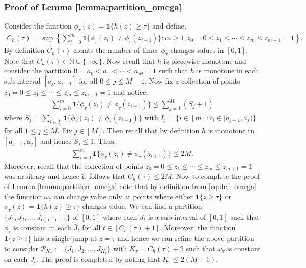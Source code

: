 \documentclass[11pt]{article}
\numberwithin{equation}{section}
\theoremstyle{definition}
\newcommand{\N}{\mathbb{N}}
\newcommand{\cP}{\mathcal{P}}
\newcommand{\one}{\bm{1}}
\begin{document}
\subsubsection{Proof of Lemma \ref{lemma:partition_omega}}\label{appendix:proofof_partition_omega}
Consider the function $\phi_\tau(z) = \one\{h(z)\geq \tau\}$ and define,
\begin{align*}
    C_h(\tau) = \sup\left\{\sum_{i=0}^{m}\one\{\phi_\tau(z_i)\neq \phi_\tau(z_{i+1})\}: m\geq 1, z_0 = 0\leq z_1\leq\cdots\leq z_m\leq z_{m+1} = 1\right\}.
\end{align*}
By definition $C_h(\tau)$ counts the number of times $\phi_\tau$ changes values in $[0,1]$. Note that $C_h(\tau)\in \N\cup\{+\infty\}$. Now recall that $h$ is piecewise monotone and consider the partition $0 = a_0<a_1<\cdots<a_M=1$ such that $h$ is monotone in each sub-interval $[a_j, a_{j+1}]$ for all $0\leq j\leq M-1$. Now fix a collection of points $z_0 = 0\leq z_1\leq\cdots\leq z_m\leq z_{m+1} = 1$ and notice,
\begin{align*}
    \sum_{i=0}^{m}\one\{\phi_\tau(z_i)\neq \phi_\tau(z_{i+1})\}\leq \sum_{j=1}^{M}(S_j + 1)
\end{align*}
where $S_j = \sum_{i\in I_j}\one\{\phi_\tau(z_i)\neq \phi_\tau(z_{i+1})\}$ with $I_j = \{i\in [m]: z_i\in [a_{j-1}, a_j)\}$ for all $1\leq j\leq M$. Fix $j\in [M]$. Then recall that by definition $h$ is monotone in $[a_{j-1}, a_j]$ and hence $S_j\leq 1$. Thus,
\begin{align*}
    \sum_{i=0}^{m}\one\{\phi_\tau(z_i)\neq \phi_\tau(z_{i+1})\}\leq 2M.
\end{align*}
Moreover, recall that the collection of points $z_0 = 0\leq z_1\leq\cdots\leq z_m\leq z_{m+1} = 1$ was arbitrary and hence it follows that $C_h(\tau)\leq 2M$. Now to complete the proof of Lemma \ref{lemma:partition_omega} note that by definition from \eqref{eq:def_omega} the function $\omega_\tau$ can change value only at points where either $\one\{z\geq \tau\}$ or $\phi_\tau(z) = \one\{h(z)\geq \tau\}$ changes value. We can find a partition $\{\bar J_1,\bar J_2,\ldots, \bar J_{C_h(\tau)+1}\}$ of $[0,1]$ where each $\bar J_t$ is a sub-interval of $[0,1]$ such that $\phi_\tau$ is constant in each $\bar J_t$ for all $t\in [C_h(\tau) + 1]$. Moreover, the function $\one\{z\geq \tau\}$ has a single jump at $z = \tau$ and hence we can refine the above partition to consider $\cP_{K_\tau} := \{J_1,J_2,\ldots, J_{K_\tau}\}$ with $K_\tau = C_h(\tau) + 2$ such that $\omega_\tau$ is constant on each $J_t$. The proof is completed by noting that $K_\tau\leq 2(M+1)$.
\end{document}
